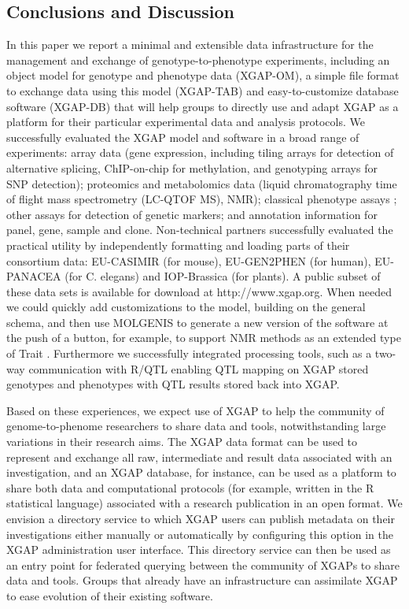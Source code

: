 \subsection{Conclusions and Discussion}
In this paper we report a minimal and extensible data infrastructure for the management and 
exchange of genotype-to-phenotype experiments, including an object model for genotype and 
phenotype data (XGAP-OM), a simple file format to exchange data using this model (XGAP-TAB) 
and easy-to-customize database software (XGAP-DB) that will help groups to directly use and 
adapt XGAP as a platform for their particular experimental data and analysis protocols. We 
successfully evaluated the XGAP model and software in a broad range of experiments: array 
data (gene expression, including tiling arrays for detection of alternative splicing, 
ChIP-on-chip for methylation, and genotyping arrays for SNP detection); proteomics and 
metabolomics data (liquid chromatography time of flight mass spectrometry (LC-QTOF MS), NMR); 
classical phenotype assays \cite{Heap:2009, Bystrykh:2005, Li:2006, Keurentjes:2006, Stranger:2007, Bailey:2008, Beamer:1999}; 
other assays for detection of genetic markers; and annotation information for panel, gene, 
sample and clone. Non-technical partners successfully evaluated the practical utility by 
independently formatting and loading parts of their consortium data: EU-CASIMIR (for mouse), EU-GEN2PHEN (for human), 
EU-PANACEA (for C. elegans) and IOP-Brassica (for plants). A public subset of these data sets 
is available for download at http://www.xgap.org. When needed we could quickly add customizations to the 
model, building on the general schema, and then use MOLGENIS to generate a new version of the 
software at the push of a button, for example, to support NMR methods as an extended type of 
Trait \cite{Fu:2009}. Furthermore we successfully integrated processing tools, such as a two-way 
communication with R/QTL \cite{Broman:2003, Arends:2010} enabling QTL mapping on XGAP 
stored genotypes and phenotypes with QTL results stored back into XGAP.

Based on these experiences, we expect use of XGAP to help the community of genome-to-phenome 
researchers to share data and tools, notwithstanding large variations in their research aims. 
The XGAP data format can be used to represent and exchange all raw, intermediate and result 
data associated with an investigation, and an XGAP database, for instance, can be used as a 
platform to share both data and computational protocols (for example, written in the R 
statistical language) associated with a research publication in an open format. We envision 
a directory service to which XGAP users can publish metadata on their investigations either 
manually or automatically by configuring this option in the XGAP administration user interface. 
This directory service can then be used as an entry point for federated querying between the 
community of XGAPs to share data and tools. Groups that already have an infrastructure can 
assimilate XGAP to ease evolution of their existing software.


